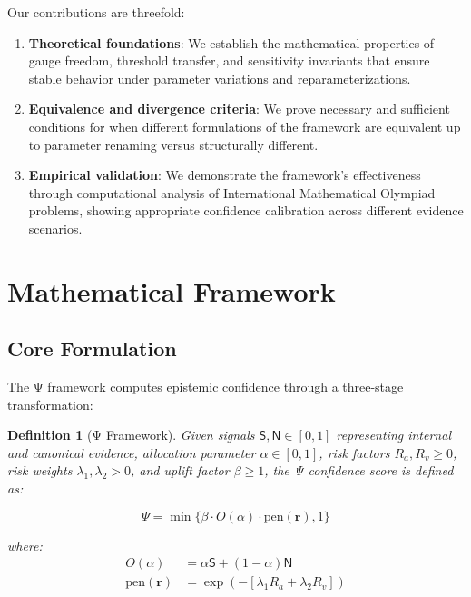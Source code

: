 \documentclass[12pt,a4paper]{article}
\newtheorem{definition}[theorem]{Definition}
\newcommand{\Ssig}{\mathsf{S}}
\newcommand{\Nsig}{\mathsf{N}}
\newcommand{\alloc}{\alpha}
\newcommand{\riskvec}{\mathbf{r}}
\newcommand{\rA}{R_a}
\newcommand{\rV}{R_v}
\newcommand{\lA}{\lambda_1}
\newcommand{\lV}{\lambda_2}
\newcommand{\uplift}{\beta}
\newcommand{\pen}{\mathrm{pen}}
\newcommand{\blend}{O}
\newcommand{\score}{\Psi}
\begin{document}
Our contributions are threefold:

\begin{enumerate}
\item \textbf{Theoretical foundations}: We establish the mathematical properties of gauge freedom, threshold transfer, and sensitivity invariants that ensure stable behavior under parameter variations and reparameterizations.

\item \textbf{Equivalence and divergence criteria}: We prove necessary and sufficient conditions for when different formulations of the framework are equivalent up to parameter renaming versus structurally different.

\item \textbf{Empirical validation}: We demonstrate the framework's effectiveness through computational analysis of International Mathematical Olympiad problems, showing appropriate confidence calibration across different evidence scenarios.
\end{enumerate}

\section{Mathematical Framework}

\subsection{Core Formulation}

The Ψ framework computes epistemic confidence through a three-stage transformation:

\begin{definition}[Ψ Framework]
Given signals $\Ssig, \Nsig \in [0,1]$ representing internal and canonical evidence, allocation parameter $\alloc \in [0,1]$, risk factors $\rA, \rV \geq 0$, risk weights $\lA, \lV > 0$, and uplift factor $\uplift \geq 1$, the Ψ confidence score is defined as:

\begin{equation}
\score = \min\{\uplift \cdot \blend(\alloc) \cdot \pen(\riskvec), 1\}
\end{equation}

where:
\begin{align}
\blend(\alloc) &= \alloc \Ssig + (1-\alloc) \Nsig \label{eq:hybrid}\\
\pen(\riskvec) &= \exp(-[\lA \rA + \lV \rV]) \label{eq:penalty}
\end{align}
\end{definition}
\end{document}
